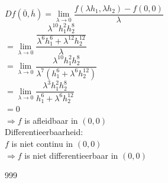 \documentclass[a4paper]{article}
\begin{document}
$Df(\overline{0}, \overline{h}) = \lim\limits_{\lambda \rightarrow 0} \dfrac{f(\lambda h_1, \lambda h_2) - f(0,0)}{\lambda}$\\

$= \lim\limits_{\lambda \rightarrow 0} \dfrac{\dfrac{\lambda^{10}h_1^2h_2^8}{\lambda^6h_1^6+\lambda^{12}h_2^{12}}}{\lambda}$\\

$= \lim\limits_{\lambda \rightarrow 0} \dfrac{\lambda^{10}h_1^2h_2^8}{\lambda^7(h_1^6+\lambda^6h_2^{12})}$\\

$= \lim\limits_{\lambda \rightarrow 0} \dfrac{\lambda^3h_1^2h_2^8}{h_1^6+\lambda^6h_2^{12}}$\\

$= 0$\\

$\Rightarrow f$ is afleidbaar in $(0,0)$\\

Differentieerbaarheid:\\

$f$ is niet continu in $(0,0)$\\

$\Rightarrow f$ is niet differentieerbaar in $(0,0)$\\

\begin{thebibliography}{999}
\end{thebibliography}
\end{document}
